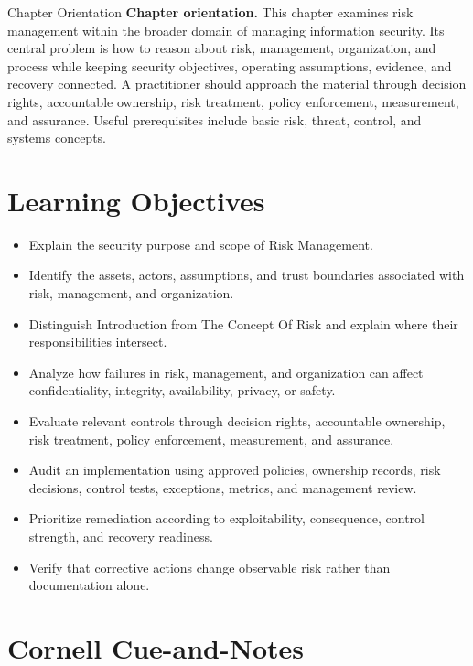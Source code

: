 \documentclass[11pt,letterpaper]{article}
\title{\CornellDocumentTitle}
\author{}
\date{}
\begin{document}
\maketitle
\begin{CornellOverviewBox}{Chapter Orientation}
\textbf{Chapter orientation.} This chapter examines risk management within the broader domain of managing information security. Its central problem is how to reason about risk, management, organization, and process while keeping security objectives, operating assumptions, evidence, and recovery connected. A practitioner should approach the material through decision rights, accountable ownership, risk treatment, policy enforcement, measurement, and assurance. Useful prerequisites include basic risk, threat, control, and systems concepts.
\end{CornellOverviewBox}
\section*{Learning Objectives}
\begin{itemize}
\item Explain the security purpose and scope of Risk Management.
\item Identify the assets, actors, assumptions, and trust boundaries associated with risk, management, and organization.
\item Distinguish Introduction from The Concept Of Risk and explain where their responsibilities intersect.
\item Analyze how failures in risk, management, and organization can affect confidentiality, integrity, availability, privacy, or safety.
\item Evaluate relevant controls through decision rights, accountable ownership, risk treatment, policy enforcement, measurement, and assurance.
\item Audit an implementation using approved policies, ownership records, risk decisions, control tests, exceptions, metrics, and management review.
\item Prioritize remediation according to exploitability, consequence, control strength, and recovery readiness.
\item Verify that corrective actions change observable risk rather than documentation alone.
\end{itemize}
\section*{Cornell Cue-and-Notes}
\end{document}
